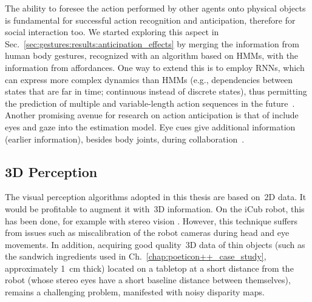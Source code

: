 The ability to foresee the action performed by other agents onto physical objects is fundamental for successful action recognition and anticipation, therefore for social interaction too.
We started exploring this aspect in Sec.~\ref{sec:gestures:results:anticipation_effects} by merging the information from human body gestures, recognized with an algorithm based on \acp{HMM}, with the information from affordances.
One way to extend this is to employ \acp{RNN}, which can express more complex dynamics than \acp{HMM} (e.g., dependencies between states that are far in time; continuous instead of discrete states), thus permitting the prediction of multiple and variable-length action sequences in the future~\cite{schydlo:2018:icra}.
Another promising avenue for research on action anticipation is that of include eyes and gaze into the estimation model.
Eye cues give additional information (earlier information), besides body joints, during \hr{} collaboration~\cite{duarte:2018:ral}.

\subsection{3D Perception}

The visual perception algorithms adopted in this thesis are based on~2D data.
It would be profitable to augment it with~3D information.
On the iCub robot, this has been done, for example with stereo vision \cite{fanello:2014:humanoids,mar:2018:tcds}.
However, this technique suffers from issues such as miscalibration of the robot cameras during head and eye movements.
In addition, acquiring good quality~3D data of thin objects (such as the sandwich ingredients used in Ch.~\ref{chap:poeticon++_case_study}, approximately 1~cm thick) located on a tabletop at a short distance from the robot (whose stereo eyes have a short baseline distance between themselves), remains a challenging problem, manifested with noisy disparity maps.
